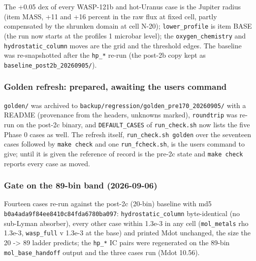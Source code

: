 \documentclass[english,a4paper]{my_memo}
\begin{document}
The +0.05 dex of every WASP-121b and hot-Uranus case is the Jupiter radius
(item MASS, +11 and +16 percent in the raw flux at fixed cell, partly
compensated by the shrunken domain at cell N-20); \texttt{lower\_profile} is item
BASE (the run now starts at the profile\textquotesingle s 1 microbar level); the
\texttt{oxygen\_chemistry} and \texttt{hydrostatic\_column} moves are the grid and the
threshold edges. The baseline was re-snapshotted after the \texttt{hp\_*} re-run
(the post-2b copy kept as \texttt{baseline\_post2b\_20260905/}).

\subsubsection{Golden refresh: prepared, awaiting the user\textquotesingle s command}\label{golden-refresh-prepared-awaiting-the-users-command}

\texttt{golden/} was archived to \texttt{backup/regression/golden\_pre170\_20260905/} with a
README (provenance from the headers, unknowns marked), \texttt{roundtrip} was re-run
on the post-2c binary, and \texttt{DEFAULT\_CASES} of \texttt{run\_check.sh} now lists the
five Phase 0 cases as well. The refresh itself, \texttt{run\_check.sh\ golden} over
the seventeen cases followed by \texttt{make\ check} and one \texttt{run\_fcheck.sh}, is the
user\textquotesingle s command to give; until it is given the reference of record is the
pre-2c state and \texttt{make\ check} reports every case as moved.

\subsubsection{Gate on the 89-bin band (2026-09-06)}\label{gate-on-the-89-bin-band-2026-09-06}

Fourteen cases re-run against the post-2c (20-bin) baseline with md5
\texttt{b0a4ada9f84ee8410c84fda6780ba097}: \texttt{hydrostatic\_column} byte-identical (no
sub-Lyman absorber), every other case within 1.3e-3 in any cell (\texttt{mol\_metals}
rho 1.3e-3, \texttt{wasp\_full} v 1.3e-3 at the base) and printed Mdot unchanged, the
size the 20 -\textgreater{} 89 ladder predicts; the \texttt{hp\_*} IC pairs were regenerated on
the 89-bin \texttt{mol\_base\_handoff} output and the three cases run (Mdot 10.56).
\end{document}
